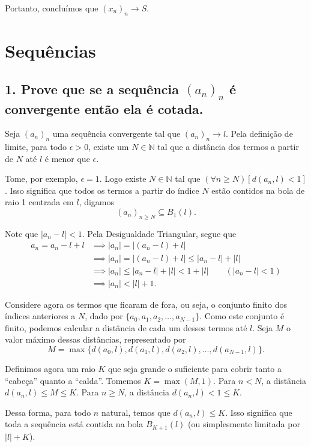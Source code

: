 \documentclass[12pt]{article}
\begin{document}
	Portanto, concluímos que $(x_n)_n \to S$. \blacksquare
	
	\section*{\centering Sequências}
	
	\subsection*{1. Prove que se a sequência $(a_n)_n$ é convergente então ela é cotada.}
	
	Seja $(a_n)_n$ uma sequência convergente tal que $(a_n)_n \to l$. Pela definição de limite, para todo $\epsilon > 0$, existe um $N \in \mathbb{N}$ tal que a distância dos termos a partir de $N$ até $l$ é menor que $\epsilon$.
	
	Tome, por exemplo, $\epsilon = 1$. Logo existe $N \in \mathbb{N}$ tal que $(\forall n \geq N)[d(a_n,l) < 1]$. Isso significa que todos os termos a partir do índice $N$ estão contidos na bola de raio 1 centrada em $l$, digamos
	\[
	(a_n)_{n \geq N} \subseteq B_1(l).
	\]
	
	Note que $|a_n - l| < 1$. Pela Desigualdade Triangular, segue que
	\begin{align*}
		a_n = a_n - l + l
		&\implies |a_n| = |(a_n - l) + l| \\
		&\implies |a_n| = |(a_n - l) + l| \leq |a_n - l| + |l| \\
		&\implies |a_n| \leq |a_n - l| + |l| < 1 + |l| \qquad (|a_n - l| < 1) \\
		&\implies |a_n| < |l| + 1.
	\end{align*}
	
	Considere agora os termos que ficaram de fora, ou seja, o conjunto finito dos índices anteriores a $N$, dado por $\{a_0, a_1, a_2, \ldots, a_{N - 1}\}$. Como este conjunto é finito, podemos calcular a distância de cada um desses termos até $l$. Seja $M$ o valor máximo dessas distâncias, representado por
	\[
	M = \max\{d(a_0, l), d(a_1, l), d(a_2, l), \ldots, d(a_{N - 1}, l)\}.
	\]
	
	Definimos agora um raio $K$ que seja grande o suficiente para cobrir tanto a ``cabeça'' quanto a ``calda''. Tomemos $K = \max(M, 1)$. Para $n < N$, a distância $d(a_n,l) \leq M \leq K$. Para $n \geq N$, a distância $d(a_n,l) < 1 \leq K$.
	
	Dessa forma, para todo $n$ natural, temos que $d(a_n,l) \leq K$. Isso significa que toda a sequência está contida na bola $B_{K + 1}(l)$ (ou simplesmente limitada por $|l| + K$).
	
\end{document}

